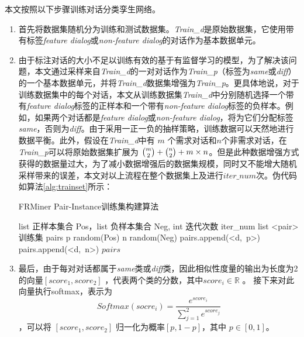 本文按照以下步骤训练对话分类孪生网络。
\begin{enumerate}
    \item 首先将数据集随机分为训练和测试数据集。\textit{Train\_d}是原始数据集，它使用带有标签\textit{feature dialog}或\textit{non-feature dialog}的对话作为基本数据单元。
    \item 由于标注对话的大小不足以训练有效的基于有监督学习的模型，为了解决该问题，本文通过采样来自\textit{Train\_d}的一对对话作为\textit{Train\_p}（标签为\textit{same}或\textit{diff}）的一个基本数据单元，并将\textit{Train\_d}数据集增强为\textit{Train\_p}。更具体地说，对于训练数据集中的每个对话，本文从训练数据集\textit{Train\_d}中分别随机选择一个带有\textit{feature dialog}标签的正样本和一个带有\textit{non-feature dialog}标签的负样本。例如，如果两个对话都是\textit{feature dialog}或\textit{non-feature dialog}，将为它们分配标签\textit{same}，否则为\textit{diff}。由于采用一正一负的抽样策略，训练数据可以天然地进行数据平衡。此外，假设在\textit{Train\_d}中有 $m$ 个需求对话和$n$个非需求对话，在\textit{Train\_p}可以将原始数据集扩展为 $\tbinom{m}{2}+\tbinom{n}{2}+m\times n$。但是此种数据增强方式获得的数据量过大，为了减小数据增强后的数据集规模，同时又不能增大随机采样带来的误差，本文对以上流程在整个数据集上及进行$iter\_num$次。伪代码如算法\ref{alg:trainset}所示：
    \begin{algorithm}[htb]
            \caption{FRMiner Pair-Instance训练集构建算法}  
            \label{alg:trainset}
            \begin{algorithmic}[1]
                \Require list 正样本集合 Pos，list 负样本集合 Neg, int 迭代次数 iter\_num 
                \Ensure list <pair> 训练集 
                    \State pairs \gets [\ ]
                            \State p \gets random(Pos)
                            \State n \gets random(Neg)
                            \State pairs.append(<d,\ p>)
                            \State pairs.append(<d,\ n>)
                        \EndFor
                    \EndFor
                    \State \Return $pairs$
                \EndFunction  
            \end{algorithmic}  
    \end{algorithm}
    \item 最后，由于每对对话都属于\textit{same}类或\textit{diff}类，因此相似性度量的输出为长度为2的向量$[score_1 , score_2]$  ，代表两个类的分数，其中$score_i \in \mathbb{R}$ 。 接下来对此向量执行softmax，表示为
$$Softmax(socre_i)=\frac{e^{score_i}}{\sum_{j=1}^2 e^{score_j}}$$ 
    ，可以将 $[score_1 , score_2]$ 归一化为概率$[p ,1-p]$，其中 $p \in [0,1]$。
\end{enumerate}



